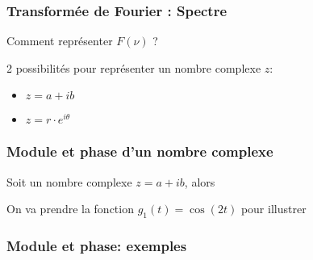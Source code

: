 \documentclass{beamer}
\begin{document}
\begin{frame}
\frametitle{Transformée de Fourier : Spectre }

Comment représenter $F(\nu)$  ? \\

\vspace{1cm} 

2 possibilités pour représenter un nombre complexe $z$: \\
\vspace{0.2cm}

\begin{itemize}
\item $z = a+ ib$
\vspace{0.4cm}
\item $z = r\cdot e^{i \theta}$
\end{itemize} 

\vspace{0.7 cm}





\end{frame} 

\begin{frame}
\frametitle{Module et phase d'un nombre complexe}


Soit un nombre complexe $z = a +ib$, alors \\
\vspace{0.3cm}




\vspace{0.7cm}
{
On va prendre la fonction $g_1(t) = \cos(2 t)$ pour illustrer
}
\end{frame}

\subsubsection{Module et phase: exemples}
\end{document}
